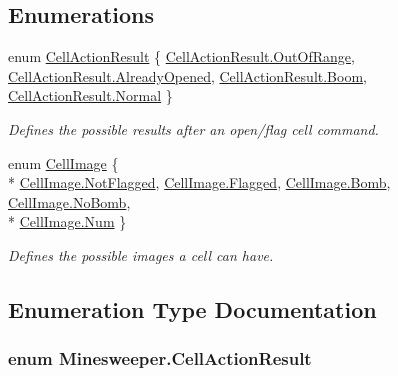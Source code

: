 \subsection*{Enumerations}
\begin{DoxyCompactItemize}
\item 
enum \hyperlink{namespace_minesweeper_af85e37deff295959aea34f4226d8ba93}{Cell\+Action\+Result} \{ \hyperlink{namespace_minesweeper_af85e37deff295959aea34f4226d8ba93a365b2699d38b61ef4b4c8a1066c8468f}{Cell\+Action\+Result.\+Out\+Of\+Range}, 
\hyperlink{namespace_minesweeper_af85e37deff295959aea34f4226d8ba93ae8154ce477091bcf77405eee73b14feb}{Cell\+Action\+Result.\+Already\+Opened}, 
\hyperlink{namespace_minesweeper_af85e37deff295959aea34f4226d8ba93ae68a20cce237a139d82cc2dd85b7d917}{Cell\+Action\+Result.\+Boom}, 
\hyperlink{namespace_minesweeper_af85e37deff295959aea34f4226d8ba93a960b44c579bc2f6818d2daaf9e4c16f0}{Cell\+Action\+Result.\+Normal}
 \}
\begin{DoxyCompactList}\small\item\em Defines the possible results after an open/flag cell command. \end{DoxyCompactList}\item 
enum \hyperlink{namespace_minesweeper_adf92d608047dafd69d16008492d317bd}{Cell\+Image} \{ \\*
\hyperlink{namespace_minesweeper_adf92d608047dafd69d16008492d317bda2f7683c80079a6b0ba066fecc3f55fb5}{Cell\+Image.\+Not\+Flagged}, 
\hyperlink{namespace_minesweeper_adf92d608047dafd69d16008492d317bda72d68acd07c783e657e2d2a9c50f16df}{Cell\+Image.\+Flagged}, 
\hyperlink{namespace_minesweeper_adf92d608047dafd69d16008492d317bdacd3abfc2f377a4c3fd9181f919d9de82}{Cell\+Image.\+Bomb}, 
\hyperlink{namespace_minesweeper_adf92d608047dafd69d16008492d317bda3332eae8860836ce9554811a48beb464}{Cell\+Image.\+No\+Bomb}, 
\\*
\hyperlink{namespace_minesweeper_adf92d608047dafd69d16008492d317bdab3e3076d9b3c53bede50d468b647b109}{Cell\+Image.\+Num}
 \}
\begin{DoxyCompactList}\small\item\em Defines the possible images a cell can have. \end{DoxyCompactList}\end{DoxyCompactItemize}


\subsection{Enumeration Type Documentation}
\hypertarget{namespace_minesweeper_af85e37deff295959aea34f4226d8ba93}{
\subsubsection[{Cell\+Action\+Result}]{\setlength{\rightskip}{0pt plus 5cm}enum {\bf Minesweeper.\+Cell\+Action\+Result}}}\label{namespace_minesweeper_af85e37deff295959aea34f4226d8ba93}


